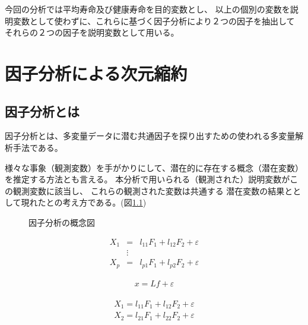 \documentclass[a4j,11pt,mc]{jreport}
\begin{document}
今回の分析では平均寿命及び健康寿命を目的変数とし、
以上の個別の変数を説明変数として使わずに、これらに基づく因子分析により２つの因子を抽出して
それらの２つの因子を説明変数として用いる。


\chapter{因子分析による次元縮約}\label{chapter:FA}


%
%
%


\section{因子分析とは}

因子分析とは、多変量データに潜む共通因子を探り出すための使われる多変量解析手法である。
%





様々な事象（観測変数）を手がかりにして、潜在的に存在する概念（潜在変数）を推定する方法とも言える。
本分析で用いられる（観測された）説明変数がこの観測変数に該当し、
これらの観測された変数は共通する
潜在変数の結果ととして現れたとの考え方である。(図\ref{FAdiagram})



\begin{figure}[H]
	\caption{因子分析の概念図}
	\label{FAdiagram}
\end{figure}



	\begin{eqnarray}
	X_1 &=&l_{11}F_1+l_{12}F_2+\varepsilon\\
	&\vdots&\\\nonumber
	X_p &=&l_{p1}F_1+l_{p2}F_2+\varepsilon
	\end{eqnarray}



		\begin{eqnarray}
		x=Lf+\varepsilon
		\end{eqnarray}

	\begin{eqnarray}
	\begin{split}
	X_1 =l_{11}F_1+l_{12}F_2+\varepsilon\\\nonumber
	X_2 =l_{21}F_1+l_{22}F_2+\varepsilon\\
	\end{split}
	\end{eqnarray}
\end{document}
